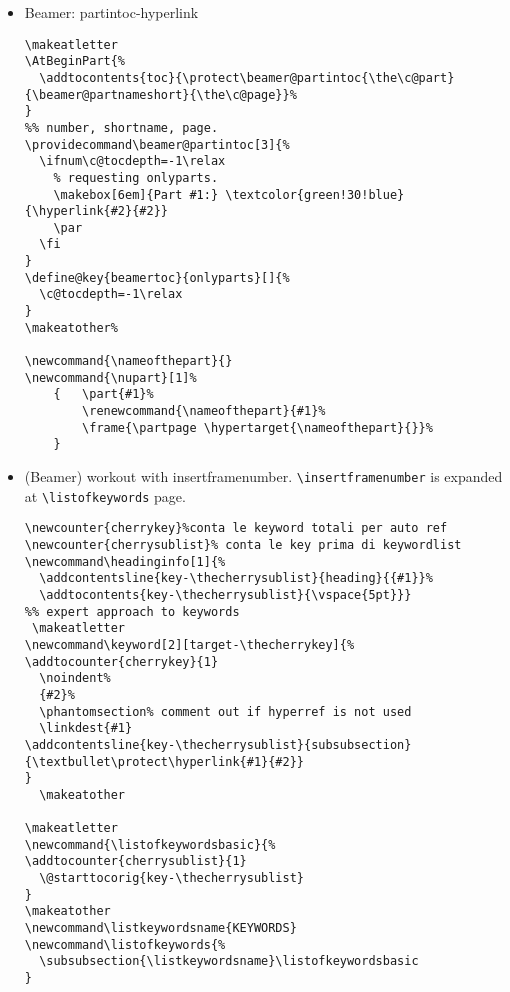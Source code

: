 \begin{itemize}
    \item Beamer: partintoc-hyperlink
    \begin{lstlisting}[basicstyle=\small\ttfamily,columns=flexible,breaklines=true]
    \makeatletter
\AtBeginPart{%
  \addtocontents{toc}{\protect\beamer@partintoc{\the\c@part}{\beamer@partnameshort}{\the\c@page}}%
}
%% number, shortname, page.
\providecommand\beamer@partintoc[3]{%
  \ifnum\c@tocdepth=-1\relax
    % requesting onlyparts.
    \makebox[6em]{Part #1:} \textcolor{green!30!blue}{\hyperlink{#2}{#2}}
    \par
  \fi
}
\define@key{beamertoc}{onlyparts}[]{%
  \c@tocdepth=-1\relax
}
\makeatother%

\newcommand{\nameofthepart}{}
\newcommand{\nupart}[1]%
    {   \part{#1}%
        \renewcommand{\nameofthepart}{#1}%
        \frame{\partpage \hypertarget{\nameofthepart}{}}%
    }
    \end{lstlisting}
    \item (Beamer) workout with insertframenumber. \verb=\insertframenumber= is expanded at \verb=\listofkeywords= page.
\begin{lstlisting}[basicstyle=\small\ttfamily,columns=flexible,breaklines=true]
\newcounter{cherrykey}%conta le keyword totali per auto ref
\newcounter{cherrysublist}% conta le key prima di keywordlist
\newcommand\headinginfo[1]{%
  \addcontentsline{key-\thecherrysublist}{heading}{{#1}}%
  \addtocontents{key-\thecherrysublist}{\vspace{5pt}}}
%% expert approach to keywords
 \makeatletter
\newcommand\keyword[2][target-\thecherrykey]{%
\addtocounter{cherrykey}{1}
  \noindent%
  {#2}%
  \phantomsection% comment out if hyperref is not used
  \linkdest{#1}
\addcontentsline{key-\thecherrysublist}{subsubsection}{\textbullet\protect\hyperlink{#1}{#2}}
}
  \makeatother
  
\makeatletter
\newcommand{\listofkeywordsbasic}{%
\addtocounter{cherrysublist}{1}
  \@starttocorig{key-\thecherrysublist}
}
\makeatother
\newcommand\listkeywordsname{KEYWORDS}
\newcommand\listofkeywords{%
  \subsubsection{\listkeywordsname}\listofkeywordsbasic
}
\end{lstlisting}
\end{itemize}
